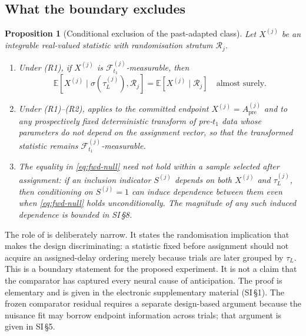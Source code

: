 \documentclass[11pt,a4paper]{article}
\newtheorem{proposition}{Proposition}
\theoremstyle{definition}
\newcommand{\F}{\mathcal{F}}
\newcommand{\Apre}{A_{\mathrm{pre}}}
\newcommand{\tauL}{\tau_L}
\begin{document}
\subsection{What the boundary excludes}
\label{sec:exclusion}

\begin{proposition}[Conditional exclusion of the past-adapted class]
\label{prop:exclusion}
Let \(X^{(j)}\) be an integrable real-valued statistic with randomisation stratum
\(\mathcal{R}_j\).
\begin{enumerate}[leftmargin=2.2em,itemsep=2pt]
\item Under \textup{(R1)}, if \(X^{(j)}\) is \(\F_{t_1}^{(j)}\)-measurable, then
\begin{equation}
\label{eq:fwd-null}
\mathbb{E}\!\left[X^{(j)}\mid\sigma\!\left(\tauL^{(j)}\right),\mathcal{R}_j\right]
=\mathbb{E}\!\left[X^{(j)}\mid\mathcal{R}_j\right]
\quad\text{almost surely.}
\end{equation}
\item Under \textup{(R1)}--\textup{(R2)},  applies to the
committed endpoint \(X^{(j)}=\Apre^{(j)}\) and to any prospectively fixed
deterministic transform of pre-\(t_1\) data whose parameters do not depend on
the assignment vector, so that the transformed statistic remains
\(\F_{t_1}^{(j)}\)-measurable.
\item The equality in \eqref{eq:fwd-null} need not hold within a sample selected
after assignment: if an inclusion indicator \(S^{(j)}\) depends on both
\(X^{(j)}\) and \(\tauL^{(j)}\), then conditioning on \(S^{(j)}=1\) can induce
dependence between them even when \eqref{eq:fwd-null} holds unconditionally. The
magnitude of any such induced dependence is bounded in SI\,\S8.
\end{enumerate}
\end{proposition}

\noindent The role of  is deliberately narrow. It states the
randomisation implication that makes the design discriminating: a statistic fixed
before assignment should not acquire an assigned-delay ordering merely because
trials are later grouped by \(\tauL\). This is a boundary statement for the
proposed experiment. It is not a claim that the comparator has captured every
neural cause of anticipation. The proof is elementary and is given in the
electronic supplementary material (SI\,\S1). The frozen comparator residual
requires a separate design-based argument because the nuisance fit may borrow
endpoint information across trials; that argument is given in SI\,\S5.
\end{document}
